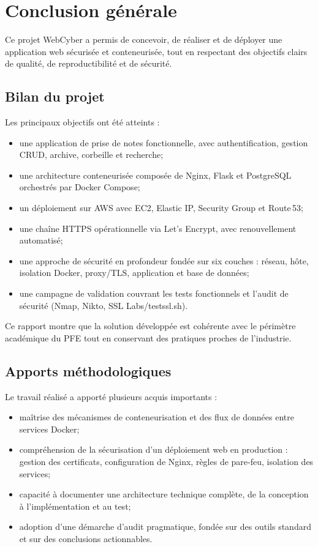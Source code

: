 \chapter{Conclusion générale}

Ce projet WebCyber a permis de concevoir, de réaliser et de déployer une
application web sécurisée et conteneurisée, tout en respectant des objectifs
clairs de qualité, de reproductibilité et de sécurité.

\section{Bilan du projet}

Les principaux objectifs ont été atteints :

\begin{itemize}
  \item une application de prise de notes fonctionnelle, avec authentification,
        gestion CRUD, archive, corbeille et recherche;
  \item une architecture conteneurisée composée de Nginx, Flask et PostgreSQL
        orchestrés par Docker Compose;
  \item un déploiement sur AWS avec EC2, Elastic IP, Security Group et Route\,53;
  \item une chaîne HTTPS opérationnelle via Let's Encrypt, avec renouvellement
        automatisé;
  \item une approche de sécurité en profondeur fondée sur six couches : réseau,
        hôte, isolation Docker, proxy/TLS, application et base de données;
  \item une campagne de validation couvrant les tests fonctionnels et l'audit
        de sécurité (Nmap, Nikto, SSL Labs/testssl.sh).
\end{itemize}

Ce rapport montre que la solution développée est cohérente avec le
périmètre académique du PFE tout en conservant des pratiques proches de
l'industrie.

\section{Apports méthodologiques}

Le travail réalisé a apporté plusieurs acquis importants :

\begin{itemize}
  \item maîtrise des mécanismes de conteneurisation et des flux de données
        entre services Docker;
  \item compréhension de la sécurisation d'un déploiement web en production :
        gestion des certificats, configuration de Nginx, règles de pare-feu,
        isolation des services;
  \item capacité à documenter une architecture technique complète, de la
        conception à l'implémentation et au test;
  \item adoption d'une démarche d'audit pragmatique, fondée sur des outils
        standard et sur des conclusions actionnables.
\end{itemize}

